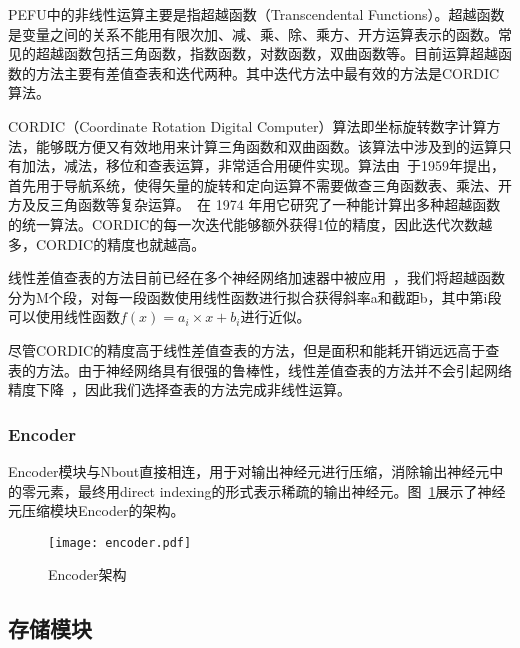 PEFU中的非线性运算主要是指超越函数（Transcendental Functions）。超越函数是变量之间的关系不能用有限次加、减、乘、除、乘方、开方运算表示的函数。常见的超越函数包括三角函数，指数函数，对数函数，双曲函数等。目前运算超越函数的方法主要有差值查表和迭代两种。其中迭代方法中最有效的方法是CORDIC算法。

CORDIC（Coordinate Rotation Digital Computer）算法即坐标旋转数字计算方法，能够既方便又有效地用来计算三角函数和双曲函数。该算法中涉及到的运算只有加法，减法，移位和查表运算，非常适合用硬件实现。算法由~\citet{Volder1959The}于1959年提出，首先用于导航系统，使得矢量的旋转和定向运算不需要做查三角函数表、乘法、开方及反三角函数等复杂运算。~\citet{Walther1971A}在 1974 年用它研究了一种能计算出多种超越函数的统一算法。CORDIC的每一次迭代能够额外获得1位的精度，因此迭代次数越多，CORDIC的精度也就越高。

线性差值查表的方法目前已经在多个神经网络加速器中被应用~\cite{Temam2012A, chen2014diannao}，我们将超越函数分为M个段，对每一段函数使用线性函数进行拟合获得斜率a和截距b，其中第i段可以使用线性函数$f(x) = a_i \times x + b_i$进行近似。

尽管CORDIC的精度高于线性差值查表的方法，但是面积和能耗开销远远高于查表的方法。由于神经网络具有很强的鲁棒性，线性差值查表的方法并不会引起网络精度下降~\cite{Temam2012A}，因此我们选择查表的方法完成非线性运算。


\subsubsection{Encoder}
Encoder模块与Nbout直接相连，用于对输出神经元进行压缩，消除输出神经元中的零元素，最终用direct indexing的形式表示稀疏的输出神经元。图~\ref{fig:encoder}展示了神经元压缩模块Encoder的架构。

\begin{figure}[h]
\centering
\texttt{[image: encoder.pdf]}
\caption{Encoder架构}
\label{fig:encoder}
\end{figure}

\subsection{存储模块}
\label{subsec:storage}

